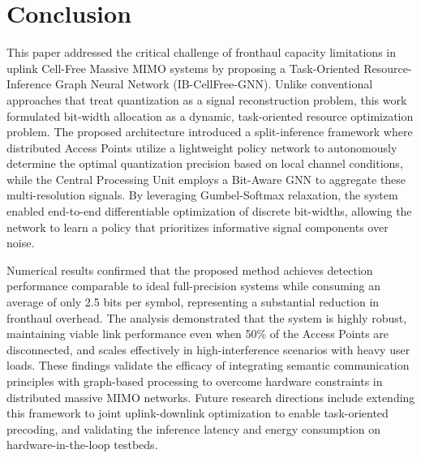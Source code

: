 \section{Conclusion}

This paper addressed the critical challenge of fronthaul capacity limitations in uplink Cell-Free Massive MIMO systems by proposing a Task-Oriented Resource-Inference Graph Neural Network (IB-CellFree-GNN). Unlike conventional approaches that treat quantization as a signal reconstruction problem, this work formulated bit-width allocation as a dynamic, task-oriented resource optimization problem. The proposed architecture introduced a split-inference framework where distributed Access Points utilize a lightweight policy network to autonomously determine the optimal quantization precision based on local channel conditions, while the Central Processing Unit employs a Bit-Aware GNN to aggregate these multi-resolution signals. By leveraging Gumbel-Softmax relaxation, the system enabled end-to-end differentiable optimization of discrete bit-widths, allowing the network to learn a policy that prioritizes informative signal components over noise.

Numerical results confirmed that the proposed method achieves detection performance comparable to ideal full-precision systems while consuming an average of only 2.5 bits per symbol, representing a substantial reduction in fronthaul overhead. The analysis demonstrated that the system is highly robust, maintaining viable link performance even when 50\% of the Access Points are disconnected, and scales effectively in high-interference scenarios with heavy user loads. These findings validate the efficacy of integrating semantic communication principles with graph-based processing to overcome hardware constraints in distributed massive MIMO networks. Future research directions include extending this framework to joint uplink-downlink optimization to enable task-oriented precoding, and validating the inference latency and energy consumption on hardware-in-the-loop testbeds.